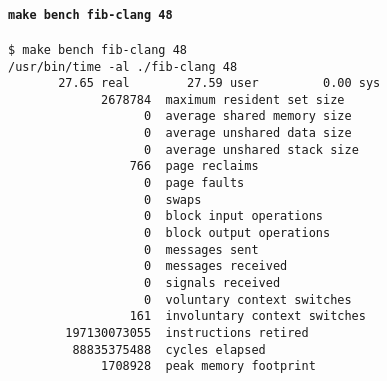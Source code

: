 \documentclass{article}
\begin{document}
\paragraph{\lstinline!make bench fib-clang 48!}
\begin{lstlisting}[language=none]
$ make bench fib-clang 48
/usr/bin/time -al ./fib-clang 48
       27.65 real        27.59 user         0.00 sys
             2678784  maximum resident set size
                   0  average shared memory size
                   0  average unshared data size
                   0  average unshared stack size
                 766  page reclaims
                   0  page faults
                   0  swaps
                   0  block input operations
                   0  block output operations
                   0  messages sent
                   0  messages received
                   0  signals received
                   0  voluntary context switches
                 161  involuntary context switches
        197130073055  instructions retired
         88835375488  cycles elapsed
             1708928  peak memory footprint
\end{lstlisting}
\end{document}
